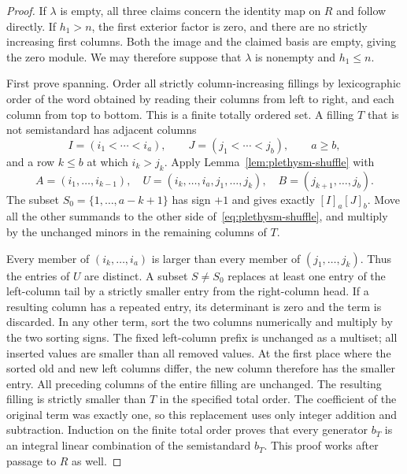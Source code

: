 \begin{proof}
If $\lambda$ is empty, all three claims concern the identity map on
$R$ and follow directly. If $h_1>n$, the first exterior factor is
zero, and there are no strictly increasing first columns. Both the
image and the claimed basis are empty, giving the zero module.
We may therefore suppose that $\lambda$ is nonempty and $h_1\leq n$.

First prove spanning. Order all strictly column-increasing fillings
by lexicographic order of the word obtained by reading their columns
from left to right, and each column from top to bottom. This is a
finite totally ordered set. A filling $T$ that is not semistandard
has adjacent columns
\[
 I=(i_1<\cdots<i_a),\qquad J=(j_1<\cdots<j_b),
 \qquad a\geq b,
\]
and a row $k\leq b$ at which $i_k>j_k$.
Apply Lemma~\ref{lem:plethysm-shuffle} with
\[
 A=(i_1,\ldots,i_{k-1}),\quad
 U=(i_k,\ldots,i_a,j_1,\ldots,j_k),\quad
 B=(j_{k+1},\ldots,j_b).
\]
The subset $S_0=\{1,\ldots,a-k+1\}$ has sign $+1$ and gives
exactly $[I]_a[J]_b$. Move all the other summands to the other side
of~\eqref{eq:plethysm-shuffle}, and multiply by the unchanged minors
in the remaining columns of $T$.

Every member of $(i_k,\ldots,i_a)$ is larger than every member of
$(j_1,\ldots,j_k)$. Thus the entries of $U$ are distinct. A subset
$S\ne S_0$ replaces at least one entry of the left-column tail by
a strictly smaller entry from the right-column head. If a resulting
column has a repeated entry, its determinant is zero and the term
is discarded. In any other term, sort the two columns numerically
and multiply by the two sorting signs. The fixed left-column prefix
is unchanged as a multiset; all inserted values are smaller than
all removed values. At the first place where the sorted old and
new left columns differ, the new column therefore has the smaller
entry. All preceding columns of the entire filling are unchanged.
The resulting filling is strictly smaller than $T$ in the specified
total order. The coefficient of the original term was exactly one,
so this replacement uses only integer addition and subtraction.
Induction on the finite total order proves that every generator
$b_T$ is an integral linear combination of the semistandard $b_T$.
This proof works after passage to $R$ as well.


\end{proof}

